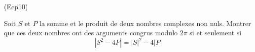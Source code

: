 \begin{tiny}(Ecp10)\end{tiny}
Soit $S$ et $P$ la somme et le produit de deux nombres complexes non nuls. Montrer que ces deux nombres ont des
arguments congrus modulo $2\pi$ si et seulement si
\[|S^2-4P|=|S|^2-4|P|\]